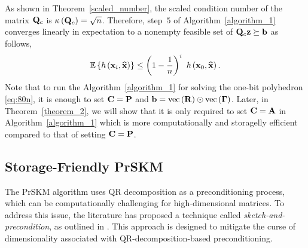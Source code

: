 \documentclass[12pt,draftcls,onecolumn]{IEEEtran}
\begin{document}
As shown in Theorem~\ref{scaled_number}, the scaled condition number of the matrix $\mathbf{Q}_{c}$ is $\kappa\left(\mathbf{Q}_{c}\right)=\sqrt{n}$. Therefore, step~$5$ of Algorithm~\ref{algorithm_1} converges linearly in expectation to a nonempty feasible set of $\mathbf{Q}_{c}\mathbf{z}\succeq\mathbf{b}$ as follows,
\begin{equation}
\label{convergence}
\mathbb{E}\left\{\hbar\left(\mathbf{x}_{i},\widehat{\mbx}\right)\right\} \leq \left(1-\frac{1}{n}\right)^{i}~ \hbar\left(\mathbf{x}_{0},\widehat{\mbx}\right).
\end{equation}\normalsize
Note that to run the Algorithm~\ref{algorithm_1} for solving the one-bit polyhedron \eqref{eq:80n}, it is enough to set $\mathbf{C}=\mathbf{P}$ and $\mathbf{b}=\operatorname{vec}\left(\mathbf{R}\right)\odot \operatorname{vec}\left(\boldsymbol{\Gamma}\right)$. Later, in Theorem~\ref{theorem_2}, we will show that it is only required to set $\mathbf{C}=\mathbf{A}$ in Algorithm~\ref{algorithm_1} which is more computationally and storagelly efficient compared to that of setting $\mathbf{C}=\mathbf{P}$.

\subsection{Storage-Friendly PrSKM}
The PrSKM algorithm uses QR decomposition as a preconditioning process, which can be computationally challenging for high-dimensional matrices. To address this issue, the literature has proposed a technique called \emph{sketch-and-precondition}, as outlined in \cite{rokhlin2008fast}. This approach is designed to mitigate the curse of dimensionality associated with QR-decomposition-based preconditioning. 
\end{document}
